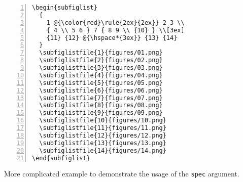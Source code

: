 \documentclass[version=3.12,american]{scrartcl}
\begin{document}
\begin{listing}
\begin{minipage}{0.4\textwidth}
\begin{Verbatim}[numbers=left]
\begin{subfiglist}
  {
    1 @{\color{red}\rule{2ex}{2ex}} 2 3 \\ 
    { 4 \\ 5 6 } 7 { 8 9 \\ {10} } \\[3ex]
    {11} {12} @{\hspace*{3ex}} {13} {14}
  }
  \subfiglistfile{1}{figures/01.png}
  \subfiglistfile{2}{figures/02.png}
  \subfiglistfile{3}{figures/03.png}
  \subfiglistfile{4}{figures/04.png}
  \subfiglistfile{5}{figures/05.png}
  \subfiglistfile{6}{figures/06.png}
  \subfiglistfile{7}{figures/07.png}
  \subfiglistfile{8}{figures/08.png}
  \subfiglistfile{9}{figures/09.png}
  \subfiglistfile{10}{figures/10.png}
  \subfiglistfile{11}{figures/11.png}
  \subfiglistfile{12}{figures/12.png}
  \subfiglistfile{13}{figures/13.png}
  \subfiglistfile{14}{figures/14.png}
\end{subfiglist}
\end{Verbatim}
\end{minipage}
\hfill
{}
\caption{More complicated example to demonstrate the usage of the \texttt{spec} argument.}
\label{lst:complicated}
\end{listing}
\end{document}
